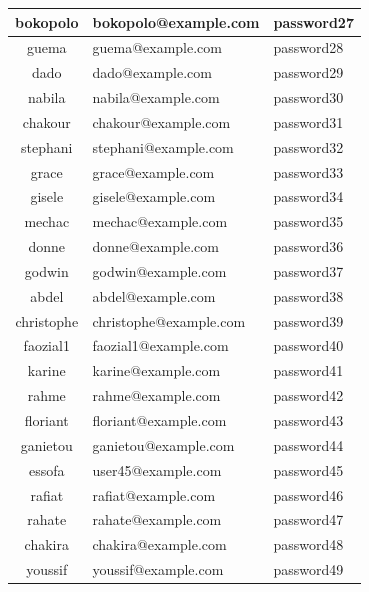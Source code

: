 \documentclass[12pt,a4paper]{article}
\begin{document}
\begin{longtable}{|c|m{5cm}|m{5cm}|}
\hline
bokopolo & bokopolo@example.com & password27 \\
\hline
guema & guema@example.com & password28 \\
\hline
dado & dado@example.com & password29 \\
\hline
nabila & nabila@example.com & password30 \\
\hline
chakour & chakour@example.com & password31 \\
\hline
stephani & stephani@example.com & password32 \\
\hline
grace & grace@example.com & password33 \\
\hline
gisele & gisele@example.com & password34 \\
\hline
mechac & mechac@example.com & password35 \\
\hline
donne & donne@example.com & password36 \\
\hline
godwin & godwin@example.com & password37 \\
\hline
abdel & abdel@example.com & password38 \\
\hline
christophe & christophe@example.com & password39 \\
\hline
faozial1 & faozial1@example.com & password40 \\
\hline
karine & karine@example.com & password41 \\
\hline
rahme & rahme@example.com & password42 \\
\hline
floriant & floriant@example.com & password43 \\
\hline
ganietou & ganietou@example.com & password44 \\
\hline
essofa & user45@example.com & password45 \\
\hline
rafiat & rafiat@example.com & password46 \\
\hline
rahate & rahate@example.com & password47 \\
\hline
chakira & chakira@example.com & password48 \\
\hline
youssif & youssif@example.com & password49 \\
\hline
\end{longtable}
\end{document}
